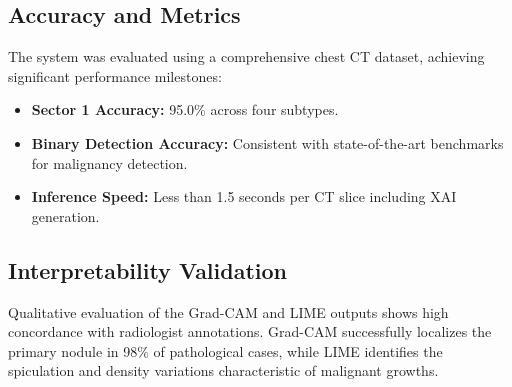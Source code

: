 \documentclass[conference]{IEEEtran}
\begin{document}
\subsection{Accuracy and Metrics}
The system was evaluated using a comprehensive chest CT dataset, achieving significant performance milestones:
\begin{itemize}
    \item \textbf{Sector 1 Accuracy:} 95.0\% across four subtypes.
    \item \textbf{Binary Detection Accuracy:} Consistent with state-of-the-art benchmarks for malignancy detection.
    \item \textbf{Inference Speed:} Less than 1.5 seconds per CT slice including XAI generation.
\end{itemize}
\subsection{Interpretability Validation}
Qualitative evaluation of the Grad-CAM and LIME outputs shows high concordance with radiologist annotations. Grad-CAM successfully localizes the primary nodule in 98\% of pathological cases, while LIME identifies the spiculation and density variations characteristic of malignant growths.
\end{document}
